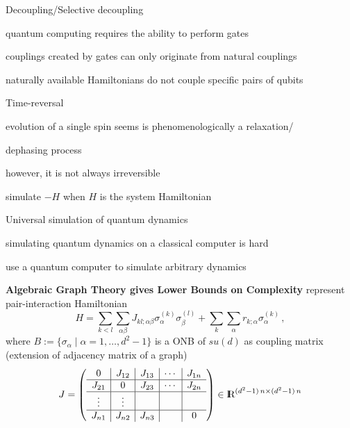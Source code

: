 \documentclass[portrait]{seminar}
\begin{document}
\begin{slide}
{\blue Decoupling/Selective decoupling}

\quad quantum computing requires the ability to perform gates

\quad couplings created by gates can only originate from natural couplings

\quad naturally available Hamiltonians do not couple specific pairs of qubits


\vfill
{\blue Time-reversal}

\quad evolution of a single spin seems is phenomenologically a relaxation/

\quad dephasing process


\quad however, it is not always irreversible

\quad simulate $-H$ when $H$ is
the system Hamiltonian

\vfill 
{\blue Universal simulation of quantum dynamics}

\quad simulating quantum dynamics on a classical computer is hard


\quad\quad\quad use a quantum computer to simulate arbitrary dynamics
\vfill
\end{slide}


\begin{slide}
{\bf Algebraic Graph Theory gives Lower Bounds on Complexity}
\vfill
represent {\blue pair-interaction Hamiltonian}
\[
H = 
\sum_{k<l} \sum_{\alpha\beta} J_{kl;\alpha\beta} 
\sigma_\alpha^{(k)}\sigma_\beta^{(l)} +
\sum_k \sum_{\alpha} r_{k;\alpha} \sigma_\alpha^{(k)}\,,
\]
where $B:=\{\sigma_\alpha\mid\alpha=1,\ldots,d^2-1\}$ is a ONB of $su(d)$
\vfill
as {\blue coupling matrix} (extension of adjacency matrix of a graph)
\[
J=\left(
\begin{array}{c|c|c|c|c}
0      & J_{12} & J_{13} & \cdots & J_{1n} \\ \hline
J_{21} & 0      & J_{23} & \cdots & J_{2n} \\ \hline
\vdots & \vdots &        &        &        \\ \hline
J_{n1} & J_{n2} & J_{n3} &        & 0 
\end{array}
\right)\in\R^{(d^2-1)\,n\times (d^2-1)\,n}
\]
\vfill
\end{slide}
\end{document}
